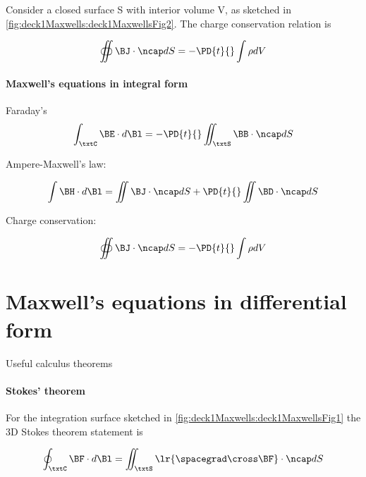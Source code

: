 Consider a closed surface S with interior volume V, as sketched in \cref{fig:deck1Maxwells:deck1MaxwellsFig2}.  The charge conservation relation is


\begin{dmath}\label{eqn:uwavesLecture1:60}
\oiint \BJ \cdot \ncap dS = -\PD{t}{} \int \rho dV
\end{dmath}

\paragraph{Maxwell's equations in integral form}

Faraday's
\begin{dmath}\label{eqn:uwavesLecture1:80}
\int_\txtC \BE \cdot d\Bl = - \PD{t}{} \iint_\txtS \BB \cdot \ncap dS
\end{dmath}

Ampere-Maxwell's law:

\begin{dmath}\label{eqn:uwavesLecture1:100}
\int \BH \cdot d\Bl = \iint \BJ \cdot \ncap dS + \PD{t}{} \iint \BD \cdot \ncap dS
\end{dmath}

Charge conservation:

\begin{dmath}\label{eqn:uwavesLecture1:120}
\oiint \BJ \cdot \ncap dS = -\PD{t}{} \int \rho dV
\end{dmath}

\section{Maxwell's equations in differential form}

Useful calculus theorems

\paragraph{Stokes' theorem}

For the integration surface sketched in \cref{fig:deck1Maxwells:deck1MaxwellsFig1} the 3D Stokes theorem statement is

\begin{dmath}\label{eqn:uwavesLecture1:140}
\oint_\txtC \BF \cdot d\Bl = \iint_\txtS \lr{ \spacegrad \cross \BF } \cdot \ncap dS
\end{dmath}

